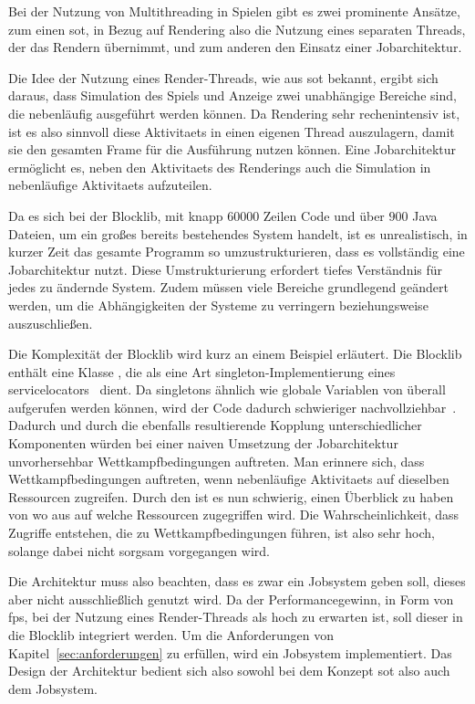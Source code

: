 Bei der Nutzung von Multithreading in Spielen gibt es zwei prominente Ansätze, zum einen \ac{sot}, in Bezug auf Rendering also die Nutzung eines separaten Threads, der das Rendern übernimmt, und zum anderen den Einsatz einer Jobarchitektur.

Die Idee der Nutzung eines Render-Threads, wie aus \ac{sot} bekannt, ergibt sich daraus, dass Simulation des Spiels und Anzeige zwei unabhängige Bereiche sind, die nebenläufig ausgeführt werden können. Da Rendering sehr rechenintensiv ist, ist es also sinnvoll diese \glspl{Aktivitaet} in einen eigenen Thread auszulagern, damit sie den gesamten Frame für die Ausführung nutzen können. Eine Jobarchitektur ermöglicht es, neben den \glspl{Aktivitaet} des Renderings auch die Simulation in nebenläufige \glspl{Aktivitaet} aufzuteilen. 

Da es sich bei der Blocklib, mit knapp $60000$ Zeilen Code und über $900$ Java Dateien, um ein großes bereits bestehendes System handelt, ist es unrealistisch, in kurzer Zeit das gesamte \gls{Programm} so umzustrukturieren, dass es vollständig eine Jobarchitektur nutzt. Diese Umstrukturierung erfordert tiefes Verständnis für jedes zu ändernde System. Zudem müssen viele Bereiche grundlegend geändert werden, um die Abhängigkeiten der Systeme zu verringern beziehungsweise auszuschließen.

Die Komplexität der Blocklib wird kurz an einem Beispiel erläutert. Die Blocklib enthält eine Klasse , die als eine Art \gls{singleton}-Implementierung eines \glspl{servicelocator}~\cite[S.~301~ff.]{Nystrom2015} dient. Da \glspl{singleton} ähnlich wie globale Variablen von überall aufgerufen werden können, wird der Code dadurch schwieriger nachvollziehbar~\cite[S.~108]{Nystrom2015}. Dadurch und durch die ebenfalls resultierende Kopplung unterschiedlicher Komponenten würden bei einer naiven Umsetzung der Jobarchitektur unvorhersehbar Wettkampfbedingungen auftreten.
Man erinnere sich, dass Wettkampfbedingungen auftreten, wenn nebenläufige \glspl{Aktivitaet} auf dieselben Ressourcen zugreifen. Durch den  ist es nun schwierig, einen Überblick zu haben von wo aus auf welche Ressourcen zugegriffen wird. Die Wahrscheinlichkeit, dass Zugriffe entstehen, die zu Wettkampfbedingungen führen, ist also sehr hoch, solange dabei nicht sorgsam vorgegangen wird.

Die Architektur muss also beachten, dass es zwar ein Jobsystem geben soll, dieses aber nicht ausschließlich genutzt wird. Da der Performancegewinn, in Form von \ac{fps}, bei der Nutzung eines Render-Threads als hoch zu erwarten ist, soll dieser in die Blocklib integriert werden. Um die Anforderungen von Kapitel~\ref{sec:anforderungen} zu erfüllen, wird ein Jobsystem implementiert. Das Design der Architektur bedient sich also sowohl bei dem Konzept \ac{sot} also auch dem Jobsystem.